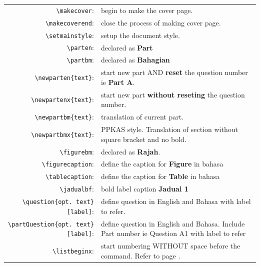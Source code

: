 \documentclass[12pt]{article}
\renewcommand{\makecover}{
	\pagestyle{titlestyle}
	\vspace*{5\baselineskip}
	\hrule \vspace*{2\baselineskip}
	\begin{center}
		\textbf{UNIVERSITI MALAYSIA PERLIS}\\[\baselineskip]
		\textbf{Manual for Writing Exam Paper Using \LaTeX }\\
		\textbf{[Manual Menulis Kertas Peperiksaan Menggunakan \LaTeX]} \\[2\baselineskip]
		by \\[\baselineskip]
		Mohd Hanafi Mat Som\\ msmhanafi[at]gmail.com\\[2\baselineskip]
		March 6, 2018\\		
		Revisions:~\today, Ver 2.2 \\[2\baselineskip]
		\hrule \vspace*{2\baselineskip}
	\end{center}
	
	Please make sure that this manual has \textbf{\thelastpageSTR~(\thelastpage)} printed pages including this front page before you start reading.%
	
	\translation{%
		Sila pastikan manual ini mengandungi\textbf{\subnumstr~(\thelastpage)}~muka surat yang bercetak termasuk muka hadapan sebelum anda membaca.%
	}\bigskip
}
\begin{document}
\begin{table}[H]
	\begin{tabularx}{\linewidth}{r X}
		\verb|\makecover|: & begin to make the cover page. \\
		
		\verb|\makecoverend|: & close the process of making cover page. \\
		
		\verb|\setmainstyle|: & setup the document style. \\
		
		\verb|\parten|: & declared as \textbf{Part} \\
		
		\verb|\partbm|: & declared as \textbf{Bahagian} \\
		
		\verb|\newparten{text}|: & start new part AND \textbf{reset} the question number ie \textbf{Part A}. \\
		
		\verb|\newpartenx{text}|: & start new part \textbf{without reseting} the question number. \\
		
		\verb|\newpartbm{text}|: & translation of current part. \\
		
		\verb|\newpartbmx{text}|: & PPKAS style. Translation of section without square bracket and no bold. \\
		
		\verb|\figurebm|: & declared as \textbf{Rajah}. \\
		
		\verb|\figurecaption|: & define the caption for \textbf{Figure} in bahasa \\
		
		\verb|\tablecaption|: & define the caption for \textbf{Table} in bahasa \\
		
		\verb|\jadualbf|: & bold label caption \textbf{Jadual 1} \\ 
		
		\verb|\question{opt. text}[label]|: & define question in English and Bahasa with label to refer.\\
		
		\verb|\partQuestion{opt. text}[label]|: & define question in English and Bahasa. Include Part number ie Question A1 with label to refer\\
		
		\verb|\listbeginx|: & start numbering WITHOUT space before the command. Refer to page \pageref{chemical}.\\
		

\end{tabularx}
\end{table}
\end{document}
